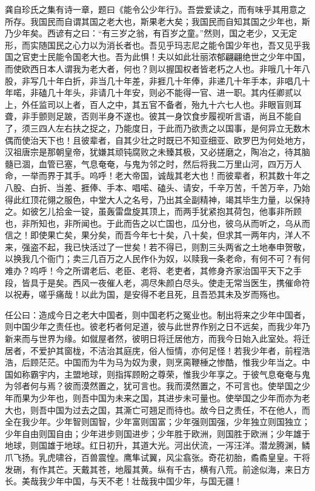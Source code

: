 \documentclass[UTF8,titlepage,oneside]{ctexbook}
\begin{document}
龚自珍氏之集有诗一章，题曰《能令公少年行》。吾尝爱读之，而有味乎其用意之所存。我国民而自谓其国之老大也，斯果老大矣；我国民而自知其国之少年也，斯乃少年矣。西谚有之曰：“有三岁之翁，有百岁之童。”然则，国之老少，又无定形，而实随国民之心力以为消长者也。吾见乎玛志尼之能令国少年也，吾又见乎我国之官吏士民能令国老大也。吾为此惧！夫以如此壮丽浓郁翩翩绝世之少年中国，而使欧西日本人谓我为老大者，何也？则以握国权者皆老朽之人也。非哦几十年八股，非写几十年白折，非当几十年差，非捱几十年俸，非递几十年手本，非唱几十年喏，非磕几十年头，非请几十年安，则必不能得一官、进一职。其内任卿贰以上，外任监司以上者，百人之中，其五官不备者，殆九十六七人也。非眼盲则耳聋，非手颤则足跛，否则半身不遂也。彼其一身饮食步履视听言语，尚且不能自了，须三四人左右扶之捉之，乃能度日，于此而乃欲责之以国事，是何异立无数木偶而使治天下也！且彼辈者，自其少壮之时既已不知亚细亚、欧罗巴为何处地方，汉祖唐宗是那朝皇帝，犹嫌其顽钝腐败之未臻其极，又必搓磨之，陶冶之，待其脑髓已涸，血管已塞，气息奄奄，与鬼为邻之时，然后将我二万里山河，四万万人命，一举而界于其手。呜呼！老大帝国，诚哉其老大也！而彼辈者，积其数十年之八股、白折、当差、捱俸、手本、唱喏、磕头、请安，千辛万苦，千苦万辛，乃始得此红顶花翎之服色，中堂大人之名号，乃出其全副精神，竭其毕生力量，以保持之。如彼乞儿拾金一锭，虽轰雷盘旋其顶上，而两手犹紧抱其荷包，他事非所顾也，非所知也，非所闻也。于此而告之以亡国也，瓜分也，彼乌从而听之，乌从而信之！即使果亡矣，果分矣，而吾今年七十矣，八十矣，但求其一两年内，洋人不来，强盗不起，我已快活过了一世矣！若不得已，则割三头两省之土地奉申贺敬，以换我几个衙门；卖三几百万之人民作仆为奴，以赎我一条老命，有何不可？有何难办？呜呼！今之所谓老后、老臣、老将、老吏者，其修身齐家治国平天下之手段，皆具于是矣。西风一夜催人老，凋尽朱颜白尽头。使走无常当医生，携催命符以祝寿，嗟乎痛哉！以此为国，是安得不老且死，且吾恐其未及岁而殇也。

任公曰：造成今日之老大中国者，则中国老朽之冤业也。制出将来之少年中国者，则中国少年之责任也。彼老朽者何足道，彼与此世界作别之日不远矣，而我少年乃新来而与世界为缘。如僦屋者然，彼明日将迁居他方，而我今日始入此室处。将迁居者，不爱护其窗栊，不洁治其庭庑，俗人恒情，亦何足怪！若我少年者，前程浩浩，后顾茫茫。中国而为牛为马为奴为隶，则烹脔鞭棰之惨酷，惟我少年当之。中国如称霸宇内，主盟地球，则指挥顾盼之尊荣，惟我少年享之。于彼气息奄奄与鬼为邻者何与焉？彼而漠然置之，犹可言也。我而漠然置之，不可言也。使举国之少年而果为少年也，则吾中国为未来之国，其进步未可量也。使举国之少年而亦为老大也，则吾中国为过去之国，其澌亡可翘足而待也。故今日之责任，不在他人，而全在我少年。少年智则国智，少年富则国富；少年强则国强，少年独立则国独立；少年自由则国自由；少年进步则国进步；少年胜于欧洲，则国胜于欧洲；少年雄于地球，则国雄于地球。红日初升，其道大光。河出伏流，一泻汪洋。潜龙腾渊，鳞爪飞扬。乳虎啸谷，百兽震惶。鹰隼试翼，风尘翕张。奇花初胎，矞矞皇皇。干将发硎，有作其芒。天戴其苍，地履其黄。纵有千古，横有八荒。前途似海，来日方长。美哉我少年中国，与天不老！壮哉我中国少年，与国无疆！
\end{document}
